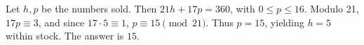 Let $h,p$ be the numbers sold. Then $21h+17p=360$, with $0\le p\le16$. Modulo 21, $17p\equiv3$, and since $17\cdot5\equiv1$, $p\equiv15\pmod{21}$. Thus $p=15$, yielding $h=5$ within stock. The answer is $\boxed{15}$.
